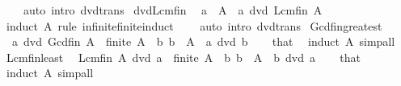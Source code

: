 \begin{isabellebody}
\ \ \ \ {\isacharparenleft}{\kern0pt}auto\ intro{\isacharcolon}{\kern0pt}\ dvd{\isacharunderscore}{\kern0pt}trans{\isacharparenright}{\kern0pt}%
\endisatagproof
{\isafoldproof}%
%
\isadelimproof
\isanewline
%
\endisadelimproof
\isanewline
{}\isamarkupfalse%
\ dvd{\isacharunderscore}{\kern0pt}Lcm{\isacharunderscore}{\kern0pt}fin{\isacharcolon}{\kern0pt}\isanewline
\ \ {\isachardoublequoteopen}a\ {\isasymin}\ A\ {\isasymLongrightarrow}\ a\ dvd\ Lcm\isactrlsub f\isactrlsub i\isactrlsub n\ A{\isachardoublequoteclose}\isanewline
%
\isadelimproof
\ \ %
\endisadelimproof
%
\isatagproof
{}\isamarkupfalse%
\ {\isacharparenleft}{\kern0pt}induct\ A\ rule{\isacharcolon}{\kern0pt}\ infinite{\isacharunderscore}{\kern0pt}finite{\isacharunderscore}{\kern0pt}induct{\isacharparenright}{\kern0pt}\isanewline
\ \ \ \ {\isacharparenleft}{\kern0pt}auto\ intro{\isacharcolon}{\kern0pt}\ dvd{\isacharunderscore}{\kern0pt}trans{\isacharparenright}{\kern0pt}%
\endisatagproof
{\isafoldproof}%
%
\isadelimproof
\isanewline
%
\endisadelimproof
\isanewline
{}\isamarkupfalse%
\ Gcd{\isacharunderscore}{\kern0pt}fin{\isacharunderscore}{\kern0pt}greatest{\isacharcolon}{\kern0pt}\isanewline
\ \ {\isachardoublequoteopen}a\ dvd\ Gcd\isactrlsub f\isactrlsub i\isactrlsub n\ A{\isachardoublequoteclose}\ \ {\isachardoublequoteopen}finite\ A{\isachardoublequoteclose}\ \ {\isachardoublequoteopen}{\isasymAnd}b{\isachardot}{\kern0pt}\ b\ {\isasymin}\ A\ {\isasymLongrightarrow}\ a\ dvd\ b{\isachardoublequoteclose}\isanewline
%
\isadelimproof
\ \ %
\endisadelimproof
%
\isatagproof
{}\isamarkupfalse%
\ that\ \isamarkupfalse%
\ {\isacharparenleft}{\kern0pt}induct\ A{\isacharparenright}{\kern0pt}\ simp{\isacharunderscore}{\kern0pt}all%
\endisatagproof
{\isafoldproof}%
%
\isadelimproof
\isanewline
%
\endisadelimproof
\isanewline
{}\isamarkupfalse%
\ Lcm{\isacharunderscore}{\kern0pt}fin{\isacharunderscore}{\kern0pt}least{\isacharcolon}{\kern0pt}\isanewline
\ \ {\isachardoublequoteopen}Lcm\isactrlsub f\isactrlsub i\isactrlsub n\ A\ dvd\ a{\isachardoublequoteclose}\ \ {\isachardoublequoteopen}finite\ A{\isachardoublequoteclose}\ \ {\isachardoublequoteopen}{\isasymAnd}b{\isachardot}{\kern0pt}\ b\ {\isasymin}\ A\ {\isasymLongrightarrow}\ b\ dvd\ a{\isachardoublequoteclose}\isanewline
%
\isadelimproof
\ \ %
\endisadelimproof
%
\isatagproof
{}\isamarkupfalse%
\ that\ \isamarkupfalse%
\ {\isacharparenleft}{\kern0pt}induct\ A{\isacharparenright}{\kern0pt}\ simp{\isacharunderscore}{\kern0pt}all%

\end{isabellebody}
